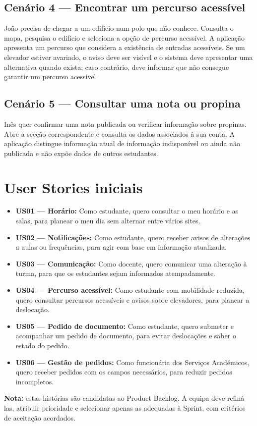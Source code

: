 \documentclass[12pt,a4paper]{article}
\begin{document}
\subsection{Cenário 4 --- Encontrar um percurso acessível}
João precisa de chegar a um edifício num polo que não conhece. Consulta o mapa, pesquisa o edifício e seleciona a opção de percurso acessível. A aplicação apresenta um percurso que considera a existência de entradas acessíveis. Se um elevador estiver avariado, o aviso deve ser visível e o sistema deve apresentar uma alternativa quando exista; caso contrário, deve informar que não consegue garantir um percurso acessível.
\subsection{Cenário 5 --- Consultar uma nota ou propina}
Inês quer confirmar uma nota publicada ou verificar informação sobre propinas. Abre a secção correspondente e consulta os dados associados à sua conta. A aplicação distingue informação atual de informação indisponível ou ainda não publicada e não expõe dados de outros estudantes.
\section{User Stories iniciais}
\begin{itemize}
\item \textbf{US01 --- Horário:} Como estudante, quero consultar o meu horário e as salas, para planear o meu dia sem alternar entre vários sites.
\item \textbf{US02 --- Notificações:} Como estudante, quero receber avisos de alterações a aulas ou frequências, para agir com base em informação atualizada.
\item \textbf{US03 --- Comunicação:} Como docente, quero comunicar uma alteração à turma, para que os estudantes sejam informados atempadamente.
\item \textbf{US04 --- Percurso acessível:} Como estudante com mobilidade reduzida, quero consultar percursos acessíveis e avisos sobre elevadores, para planear a deslocação.
\item \textbf{US05 --- Pedido de documento:} Como estudante, quero submeter e acompanhar um pedido de documento, para evitar deslocações e saber o estado do pedido.
\item \textbf{US06 --- Gestão de pedidos:} Como funcionária dos Serviços Académicos, quero receber pedidos com os campos necessários, para reduzir pedidos incompletos.
\end{itemize}
\noindent\textbf{Nota:} estas histórias são candidatas ao Product Backlog. A equipa deve refiná-las, atribuir prioridade e selecionar apenas as adequadas à Sprint, com critérios de aceitação acordados.
\end{document}
